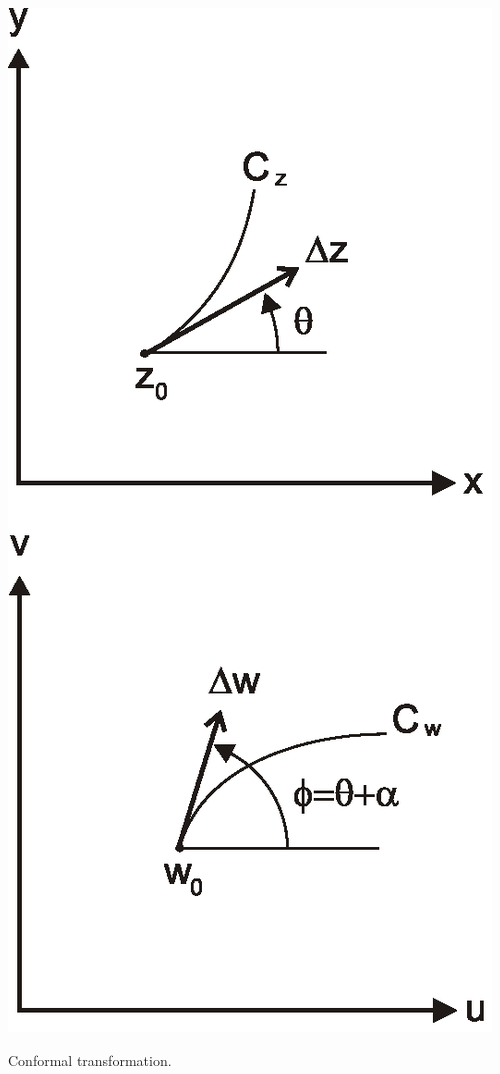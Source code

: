 \begin{marginfigure}
\centering
\includegraphics{complex/figures/conformal_portrait}
\caption{Conformal transformation.}
\label{fig-conformal}
\end{marginfigure}


